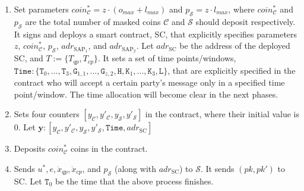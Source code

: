 \begin{enumerate}
\begin{enumerate}
\item Set parameters  $coin^{\scriptscriptstyle *}_{\scriptscriptstyle\mathcal C}=z\cdot (o_{\scriptscriptstyle max}+l_{\scriptscriptstyle max})$ and $p_{\scriptscriptstyle\mathcal{S}}=z\cdot l_{\scriptscriptstyle max}$, where $coin^{\scriptscriptstyle *}_{\scriptscriptstyle\mathcal C}$ and $p_{\scriptscriptstyle\mathcal{S}}$ are   the total number of masked coins $\mathcal C$ and $\mathcal S$ should deposit respectively. It signs and deploys a smart contract, SC, that explicitly specifies  parameters $z$,  $coin^{\scriptscriptstyle *}_{\scriptscriptstyle\mathcal C}$, $p_{\scriptscriptstyle\mathcal{S}}$,  $adr_{\scriptscriptstyle\text{SAP}_{\scriptscriptstyle 1}}$, and $adr_{\scriptscriptstyle\text{SAP}_{\scriptscriptstyle 2}}$. Let $adr_{\scriptscriptstyle \text{SC}}$ be the address of the deployed SC, and $T:=\{T_{\scriptscriptstyle qp},T_{\scriptscriptstyle cp}\}$. It sets a set of time points/windows, $\texttt{Time}:\{ \texttt{T}_{\scriptscriptstyle 0},..., \texttt{T}_{\scriptscriptstyle 3},\texttt{G}_{\scriptscriptstyle 1,1},...,\texttt{G}_{\scriptscriptstyle z,2},\texttt{H}, \texttt{K}_{\scriptscriptstyle 1},...,\texttt{K}_{\scriptscriptstyle 3}, \texttt{L}\}$, that are explicitly specified in the contract who will accept a certain party's message only in a specified  time point/window. The time allocation will become clear in the next phases. 


\item Sets four counters $[y_{\scriptscriptstyle\mathcal C},y'_{\scriptscriptstyle\mathcal C},y_{\scriptscriptstyle\mathcal S}, y'_{\scriptscriptstyle\mathcal S}]$ in the contract, where their initial value is $0$. Let $\bm{y}: [y_{\scriptscriptstyle\mathcal C},y'_{\scriptscriptstyle\mathcal C},y_{\scriptscriptstyle\mathcal S}, y'_{\scriptscriptstyle\mathcal S}, \texttt{Time},adr_{\scriptscriptstyle \text{SC}}]$

\item Deposits $coin^{\scriptscriptstyle *}_{\scriptscriptstyle\mathcal C}$ coins in the contract.

\item Sends $u^{\scriptscriptstyle *}, e, \ddot{x}_{\scriptscriptstyle qp},\ddot{x}_{\scriptscriptstyle cp}$, and $p_{\scriptscriptstyle\mathcal{S}}$ (along with $adr_{\scriptscriptstyle \text{SC}}$) to $\mathcal S$. It sends  $(pk,pk')$ to SC. Let $\texttt{T}_{\scriptscriptstyle 0}$ be the time that the above process finishes. 






\end{enumerate}
\end{enumerate}
